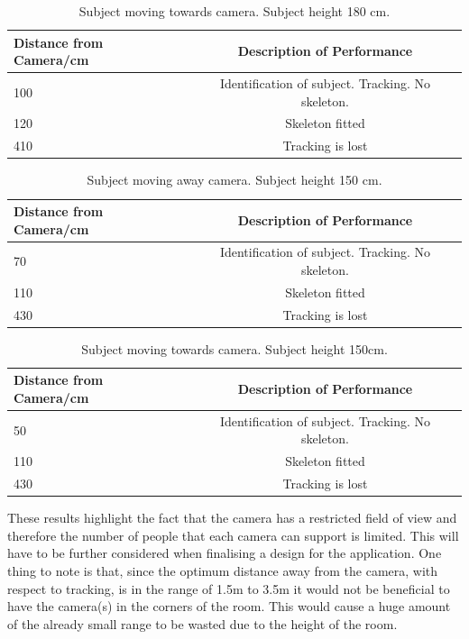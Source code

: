\documentclass[a4paper]{article}
\begin{document}
\begin{table}[h]
\center
\begin{tabular}{ | l | c |}
\hline
Distance from Camera/cm & Description of Performance \\
\hline
100 & Identification of subject. Tracking. No skeleton.\\
120 & Skeleton fitted\\
410 & Tracking is lost\\
\hline
\end{tabular}
\caption{Subject moving towards camera. Subject height 180 cm.}
\label{cam_range_180_toward}
\end{table}

\begin{table}[h]
\center
\begin{tabular}{ | l | c |}
\hline
Distance from Camera/cm & Description of Performance \\
\hline
70 & Identification of subject. Tracking. No skeleton.\\
110 & Skeleton fitted\\
430 & Tracking is lost\\
\hline
\end{tabular}
\caption{Subject moving away camera. Subject height 150 cm.}
\label{cam_range_150_away}
\end{table}

\begin{table}[h]
\center
\begin{tabular}{ | l | c |}
\hline
Distance from Camera/cm & Description of Performance \\
\hline
50 & Identification of subject. Tracking. No skeleton.\\
110 & Skeleton fitted\\
430 & Tracking is lost\\
\hline
\end{tabular}
\caption{Subject moving towards camera. Subject height 150cm.}
\label{cam_range_150_toward}
\end{table}
\noindent
These results highlight the fact that the camera has a restricted field of view and therefore the number of people that each camera can support is limited. This will have to be further considered when finalising a design for the application. One thing to note is that, since  the optimum distance away from the camera, with respect to tracking, is in the range of 1.5m to 3.5m it would not be beneficial to have the camera(s) in the corners of the room. This would cause a huge amount of the already small range to be wasted due to the height of the room. 
\end{document}
